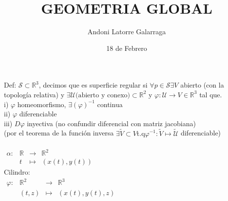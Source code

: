 \documentclass{article}
\title{GEOMETRIA GLOBAL}
\author{Andoni Latorre Galarraga}
\date{18 de Febrero}
\newcommand{\bb}[1]{\mathbb{#1}}
\begin{document}
\maketitle
Def: $\mathcal{S}\subset \bb{R}^3$, decimos que es superficie regular si $\forall p \in \mathcal{S} \exists V$ abierto (con la topología relativa) y $\exists \mathcal{U} \text{(abierto y conexo)} \subset \bb{R}^2$ y $\varphi : \mathcal{U} \longrightarrow V\in \bb{R}^3 $ tal que.\\
i) $\varphi$ homeomorfismo, $\exists (\varphi)^{-1}$ continua \\
ii) $\varphi$ diferenciable \\
iii) $D\varphi$ inyectiva (no confundir diferencial con matriz jacobiana)\\
(por el teorema de la función inversa $\exists \tilde{V}\subset V \text{t.q} \varphi^{-1} : \tilde{V}\longmapsto \tilde{\mathcal{U}}$ diferenciable)
\\
\\
$\begin{array}{crcl}
\alpha : & \bb{R} & \longrightarrow & \bb{R}^2 \\
& t & \longmapsto     & (x(t),y(t))
\end{array}$\\
Cilindro:\\
$\begin{array}{crcl}
\varphi : & \bb{R}^2 & \longrightarrow & \bb{R}^3 \\
& (t,z) & \longmapsto     & (x(t),y(t),z)
\end{array}$
\end{document}
